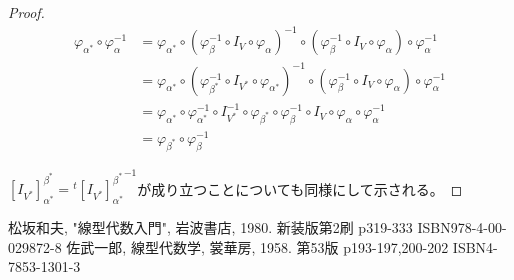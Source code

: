 \documentclass[dvipdfmx]{jsarticle}
\begin{document}
\begin{proof}
\begin{align*}
\varphi_{\alpha^{*}} \circ \varphi_{\alpha}^{- 1} &= \varphi_{\alpha^{*}} \circ \left( \varphi_{\beta}^{- 1} \circ I_{V} \circ \varphi_{\alpha} \right)^{- 1} \circ \left( \varphi_{\beta}^{- 1} \circ I_{V} \circ \varphi_{\alpha} \right) \circ \varphi_{\alpha}^{- 1}\\
&= \varphi_{\alpha^{*}} \circ \left( \varphi_{\beta^{*}}^{- 1} \circ I_{V^{*}} \circ \varphi_{\alpha^{*}} \right)^{- 1} \circ \left( \varphi_{\beta}^{- 1} \circ I_{V} \circ \varphi_{\alpha} \right) \circ \varphi_{\alpha}^{- 1}\\
&= \varphi_{\alpha^{*}} \circ \varphi_{\alpha^{*}}^{- 1} \circ I_{V^{*}}^{- 1} \circ \varphi_{\beta^{*}} \circ \varphi_{\beta}^{- 1} \circ I_{V} \circ \varphi_{\alpha} \circ \varphi_{\alpha}^{- 1}\\
&= \varphi_{\beta^{*}} \circ \varphi_{\beta}^{- 1}
\end{align*}\par
$\left[ I_{V^{*}} \right]^{\beta^{*}}_{\alpha^{*}} ={}^{t}{\left[ I_{V^{*}} \right]^{\beta^{*}}_{\alpha^{*}}}^{- 1}$が成り立つことについても同様にして示される。
\end{proof}
\begin{thebibliography}{50}
  松坂和夫, "線型代数入門", 岩波書店, 1980. 新装版第2刷 p319-333 ISBN978-4-00-029872-8
  佐武一郎, 線型代数学, 裳華房, 1958. 第53版 p193-197,200-202 ISBN4-7853-1301-3
\end{thebibliography}
\end{document}
